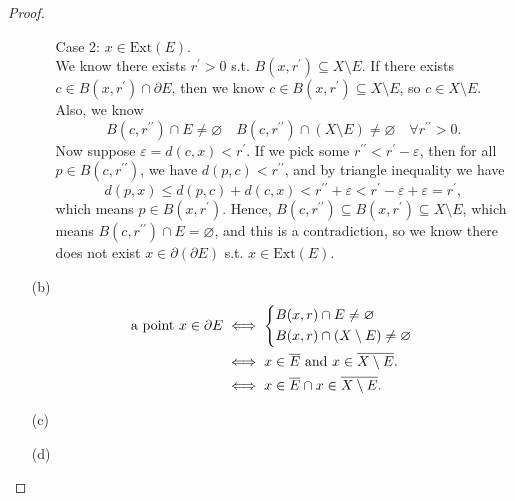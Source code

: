 \begin{proof}
\begin{itemize}
\begin{itemize}
      \item [Case 2:] \(x \in \mathrm{Ext}(E) \). \\ 
      We know there exists \(r^{\prime} > 0\) s.t. \(B(x, r^{\prime}) \subseteq X\setminus E\). If there exists \(c \in B(x, r^{\prime} ) \cap \partial E\), then we know \(c \in B(x, r^{\prime} ) \subseteq X\setminus E\), so \(c \in X\setminus E\). Also, we know 
      \[
        B(c, r^{\prime\prime} ) \cap E \neq \varnothing \quad B(c, r^{\prime\prime} ) \cap (X \setminus E) \neq \varnothing \quad \forall r^{\prime\prime} >0.
      \]
      Now suppose \(\varepsilon = d(c, x) < r^{\prime} \). If we pick some \(r^{\prime\prime} < r^{\prime}  - \varepsilon \), then for all \(p \in B(c, r^{\prime\prime} )\), we have \(d(p, c) < r^{\prime\prime} \), and by triangle inequality we have 
      \[
        d(p,x) \le d(p,c) + d(c,x) < r^{\prime\prime} + \varepsilon < r^{\prime} - \varepsilon + \varepsilon = r^{\prime} ,
      \] which means \(p \in B(x, r^{\prime} )\). Hence, \(B(c, r^{\prime\prime} ) \subseteq B(x, r^{\prime} ) \subseteq X\setminus E\), which means \(B(c, r^{\prime\prime} ) \cap E = \varnothing \), and this is a contradiction, so we know there does not exist \(x \in \partial (\partial E) \) s.t. \(x \in \mathrm{Ext}(E) \).   
    \end{itemize}
    \item [(b)]
    \begin{align*}
      \text{a point } x \in \partial E &\iff \begin{dcases}
        B(x, r) \cap E \neq \varnothing \\
        B(x,r) \cap (X\setminus E) \neq \varnothing 
      \end{dcases} \\
      & \iff x \in \overline{E} \text{ and } x \in \overline{X \setminus E}.  \\
      &\iff x \in \overline{E} \cap x \in \overline{X \setminus E}.  
    \end{align*}
    \item [(c)]
    \item [(d)]
  \end{itemize}
\end{proof}
